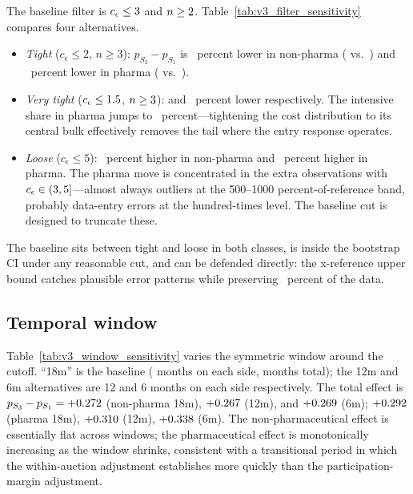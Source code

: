 The baseline filter is $c_\epsilon \le 3$ and $n \ge 2$. Table~\ref{tab:v3_filter_sensitivity} compares four alternatives.
\begin{itemize}
\item \emph{Tight} ($c_\epsilon \le 2$, $n \ge 3$): $p_{S_3} - p_{S_1}$ is \filterTightDropNp~percent lower in non-pharma (\filterTightNp{} vs.\ \filterBaseNp) and \filterTightDropPh~percent lower in pharma (\filterTightPh{} vs.\ \filterBasePh).
\item \emph{Very tight} ($c_\epsilon \le 1.5$, $n \ge 3$): \filterVtightDropNp{} and \filterVtightDropPh~percent lower respectively. The intensive share in pharma jumps to \filterVtightSharePh~percent---tightening the cost distribution to its central bulk effectively removes the tail where the entry response operates.
\item \emph{Loose} ($c_\epsilon \le 5$): \filterLooseUpNp~percent higher in non-pharma and \filterLooseUpPh~percent higher in pharma. The pharma move is concentrated in the extra observations with $c_\epsilon \in (3, 5]$---almost always outliers at the 500--1000 percent-of-reference band, probably data-entry errors at the hundred-times level. The baseline cut is designed to truncate these.
\end{itemize}
The baseline sits between tight and loose in both classes, is inside the bootstrap CI under any reasonable cut, and can be defended directly: the \filterCepsUpper{}x-reference upper bound catches plausible error patterns while preserving \filterPreservedPct~percent of the data.

\subsection{Temporal window}

Table~\ref{tab:v3_window_sensitivity} varies the symmetric window around the \policyCutoffMonth{} cutoff. ``18m'' is the baseline (\structuralWindowM{} months on each side, \nDataMonths{} months total); the 12m and 6m alternatives are 12 and 6 months on each side respectively. The total effect is $p_{S_3} - p_{S_1} = +0.272$ (non-pharma 18m), $+0.267$ (12m), and $+0.269$ (6m); $+0.292$ (pharma 18m), $+0.310$ (12m), $+0.338$ (6m). The non-pharmaceutical effect is essentially flat across windows; the pharmaceutical effect is monotonically increasing as the window shrinks, consistent with a transitional period in which the within-auction adjustment establishes more quickly than the participation-margin adjustment.

